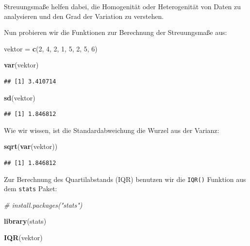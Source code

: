 \documentclass[
]{book}
\newenvironment{Shaded}{\begin{snugshade}}{\end{snugshade}}
\newcommand{\CommentTok}[1]{\textcolor[rgb]{0.56,0.35,0.01}{\textit{#1}}}
\newcommand{\DecValTok}[1]{\textcolor[rgb]{0.00,0.00,0.81}{#1}}
\newcommand{\FunctionTok}[1]{\textcolor[rgb]{0.13,0.29,0.53}{\textbf{#1}}}
\newcommand{\NormalTok}[1]{#1}
\newcommand{\OtherTok}[1]{\textcolor[rgb]{0.56,0.35,0.01}{#1}}
\begin{document}
Streuungsmaße helfen dabei, die Homogenität oder Heterogenität von Daten zu analysieren und den Grad der Variation zu verstehen.

Nun probieren wir die Funktionen zur Berechnung der Streuungsmaße aus:

\begin{Shaded}
\begin{Highlighting}[]
\NormalTok{vektor }\OtherTok{=} \FunctionTok{c}\NormalTok{(}\DecValTok{2}\NormalTok{, }\DecValTok{4}\NormalTok{, }\DecValTok{2}\NormalTok{, }\DecValTok{1}\NormalTok{, }\DecValTok{5}\NormalTok{, }\DecValTok{2}\NormalTok{, }\DecValTok{5}\NormalTok{, }\DecValTok{6}\NormalTok{)}

\FunctionTok{var}\NormalTok{(vektor)}
\end{Highlighting}
\end{Shaded}

\begin{verbatim}
## [1] 3.410714
\end{verbatim}

\begin{Shaded}
\begin{Highlighting}[]
\FunctionTok{sd}\NormalTok{(vektor)}
\end{Highlighting}
\end{Shaded}

\begin{verbatim}
## [1] 1.846812
\end{verbatim}

Wie wir wissen, ist die Standardabweichung die Wurzel aus der Varianz:

\begin{Shaded}
\begin{Highlighting}[]
\FunctionTok{sqrt}\NormalTok{(}\FunctionTok{var}\NormalTok{(vektor))}
\end{Highlighting}
\end{Shaded}

\begin{verbatim}
## [1] 1.846812
\end{verbatim}

Zur Berechnung des Quartilabstands (IQR) benutzen wir die \texttt{IQR()} Funktion aus dem \texttt{stats} Paket:

\begin{Shaded}
\begin{Highlighting}[]
\CommentTok{\# install.packages("stats")}

\FunctionTok{library}\NormalTok{(stats)}

\FunctionTok{IQR}\NormalTok{(vektor)}
\end{Highlighting}
\end{Shaded}
\end{document}
